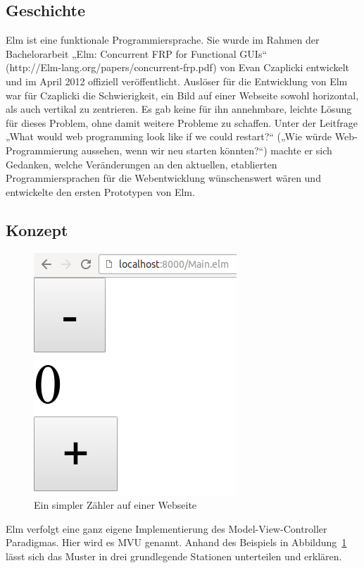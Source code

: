 \subsection{Geschichte}
\label{sec:Geschichte}
Elm ist eine funktionale Programmiersprache. Sie wurde im Rahmen der Bachelorarbeit „Elm: Concurrent FRP for Functional GUIs“\\
 (http://Elm-lang.org/papers/concurrent-frp.pdf)
von Evan Czaplicki entwickelt und im April 2012 offiziell veröffentlicht.
Auslöser für die Entwicklung von Elm war für Czaplicki die Schwierigkeit, ein Bild auf einer Webseite sowohl horizontal, als auch vertikal zu zentrieren. Es gab keine für ihn annehmbare, leichte Lösung für dieses Problem, ohne damit weitere Probleme zu schaffen. Unter der Leitfrage „What would web programming look like if we could restart?“ („Wie würde Web-Programmierung aussehen, wenn wir neu starten könnten?“) machte er sich Gedanken, welche Veränderungen an den aktuellen, etablierten Programmiersprachen für die Webentwicklung wünschenswert wären und entwickelte den ersten Prototypen von Elm.

\subsection{Konzept}
\label{sec:Konzept}
\begin{figure}[h]
	\centering  
	\includegraphics[scale=0.5]{img/counter.png}
	\caption{Ein simpler Zähler auf einer Webseite}\label{fig:counter}
\end{figure}
\noindent Elm verfolgt eine ganz eigene Implementierung des Model-View-Controller Paradigmas. Hier wird es \ac{MVU} genannt. Anhand des Beispiels in Abbildung~\ref{fig:counter} lässt sich das Muster in drei grundlegende Stationen unterteilen und erklären.

